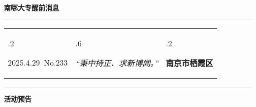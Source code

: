 \documentclass[letterpaper, 12pt]{article}
\begin{document}
\begin{center}
    \Huge\textbf{南哪大专醒前消息}
\end{center}
\vspace{4mm}
\hrule
\renewcommand\tabularxcolumn[1]{m{#1}}
\begin{tabularx}{\textwidth}{>{\hsize.2\hsize}X>{\hsize.6\hsize}X>{\hsize.2\hsize}X}
    \begin{flushleft}
        2025.4.29\, No.233
    \end{flushleft}
    &
    \begin{center}
        \textit{“秉中持正、求新博闻。”}
    \end{center}
    &
    \begin{flushright}
        \textbf{南京市栖霞区}
    \end{flushright}
\end{tabularx}
\vspace{-3.5mm}
\hrule
\vspace{4mm}
\centerline{\huge\textbf{活动预告}}
\end{document}
